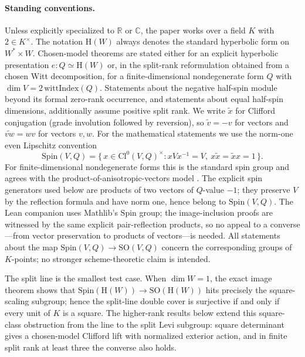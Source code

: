 \documentclass{birkjour}
\theoremstyle{plain}
\theoremstyle{definition}
\theoremstyle{remark}
\numberwithin{equation}{section}
\newcommand{\Cl}{\mathrm{Cl}}
\newcommand{\Spin}{\mathrm{Spin}}
\newcommand{\SO}{\mathrm{SO}}
\newcommand{\Hyp}{\mathrm{H}}
\begin{document}
\paragraph{Standing conventions.}
Unless explicitly specialized to $\mathbb{R}$ or $\mathbb{C}$, the paper works
over a field $K$ with $2\in K^\times$. The notation $\Hyp(W)$ always
denotes the standard hyperbolic form on $W^* \times W$. Chosen-model theorems
are stated either for an explicit hyperbolic presentation
$e:Q \simeq \Hyp(W)$ or, in the split-rank reformulation obtained from a
chosen Witt decomposition, for a
finite-dimensional nondegenerate form $Q$ with
$\dim V = 2\,\mathrm{wittIndex}(Q)$. Statements about the negative half-spin
module beyond its formal zero-rank occurrence, and statements about equal
half-spin dimensions, additionally assume positive split rank.
We write $\tilde x$ for Clifford conjugation (grade involution followed by
reversion), so $\tilde v=-v$ for vectors and $\widetilde{vw}=wv$ for vectors
\(v,w\). For the mathematical statements we use the norm-one even Lipschitz
convention
\[
  \Spin(V,Q)=
  \{\,x\in\Cl^0(V,Q)^\times:
       xVx^{-1}=V,\ x\tilde x=\tilde x x=1\,\}.
\]
For finite-dimensional nondegenerate forms this is the standard spin group and
agrees with the product-of-anisotropic-vectors model
\cite{Artin1957GeometricAlgebra,OMeara2000QuadraticForms}. The explicit
spin generators used below are products of two vectors of \(Q\)-value \(-1\);
they preserve \(V\) by the reflection formula and have norm one, hence belong to
\(\Spin(V,Q)\). The Lean companion uses Mathlib's \(\Spin\) group;
the image-inclusion proofs are witnessed by the same explicit
pair-reflection products, so no appeal to a converse---from vector preservation
to products of vectors---is needed.
All statements about the map $\Spin(V,Q)\to\SO(V,Q)$ concern the corresponding
groups of $K$-points; no stronger scheme-theoretic claim is intended.

The split line is the smallest test case. When $\dim W=1$, the exact image
theorem shows that $\Spin(\Hyp(W)) \to \SO(\Hyp(W))$ hits precisely the
square-scaling subgroup; hence the split-line double cover is surjective if and
only if every unit of \(K\) is a square. The higher-rank results below extend
this square-class obstruction from the line to the split Levi subgroup: square
determinant gives a chosen-model Clifford lift with normalized exterior action,
and in finite split rank at least three the converse also holds.

\end{document}
